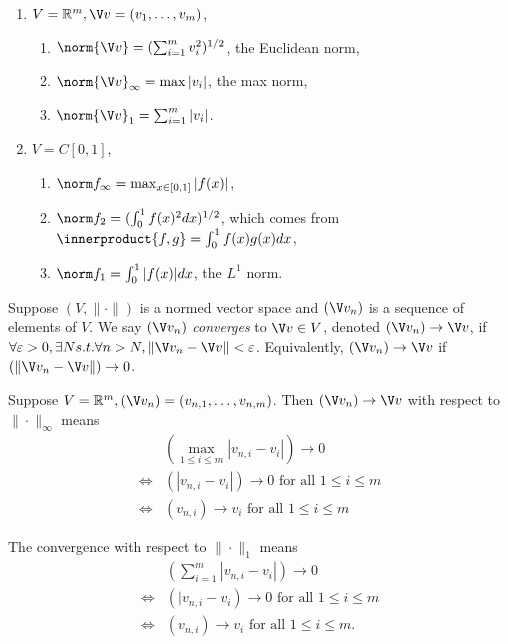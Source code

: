 \documentclass[a4paper]{article}
\theoremstyle{definition}
\begin{document}
\begin{eg}\leavevmode
  \begin{enumerate}
  \item $V= \mathbb{R}^m, \V v = (v_1,\ldots,v_m)$,
    \begin{enumerate}
    \item $\norm{\V v} = (\sum_{i=1}^m v_i^2)^{1/2}$, the Euclidean norm,
    \item $\norm{\V v}_\infty = \max |v_i|$, the max norm,
    \item $\norm{\V v}_1 = \sum_{i=1}^m |v_i|$.
    \end{enumerate}
  \item $V = C[0, 1]$,
    \begin{enumerate}
    \item $\norm f_\infty=\max_{x\in[0,1]} |f(x)|$,
    \item $\norm f_2 = (\int_0^1 f(x)^2 dx)^{1/2}$, which comes from $\innerproduct{f, g} = \int_0^1f(x)g(x) dx$,
    \item $\norm f_1 = \int_0^1|f(x)| dx$, the $L^1$ norm.
    \end{enumerate}
  \end{enumerate}
\end{eg}

\begin{definition}[Convergence]
  Suppose $(V, \|\cdot\|)$ is a normed vector space and $(\V v_n)$ is a sequence of elements of $V$. We say $(\V v_n)$ \emph{converges} to $\V v\in V$, denoted $(\V v_n)\to \V v$, if $\forall\varepsilon>0,\exists N s.t. \forall n>N, \|\V v_n-\V v\|<\varepsilon$. Equivalently, $(\V v_n)\to \V v$ if $(\|\V v_n-\V v\|)\to 0$.
\end{definition}

\begin{ex}
  Suppose $V=\mathbb{R}^m, (\V v_n) = (v_{n,1},\ldots,v_{n,m})$. Then $(\V v_n)\to \V v$ with respect to $\|\cdot\|_\infty$ means
  \begin{align*}
    & \left( \max_{1\leq i \leq m}|v_{n,i}-v_i| \right) \to 0 \\
    \Longleftrightarrow & (|v_{n,i}-v_i|)\to 0 \text{ for all } 1\leq i\leq m \\
    \Longleftrightarrow & (v_{n,i})\to v_i \text{ for all } 1\leq i\leq m
  \end{align*}

   The convergence with respect to $\|\cdot\|_1$ means
   \begin{align*}
     & \left( \sum_{i=1}^m |v_{n,i}-v_i| \right) \to 0 \\
     \Longleftrightarrow & \left( |v_{n,i}-v_i \right)\to 0 \text{ for all } 1\leq i\leq m \\ 
    \Longleftrightarrow & (v_{n,i})\to v_i \text{ for all } 1\leq i\leq m.
  \end{align*}
\end{ex}
\end{document}
